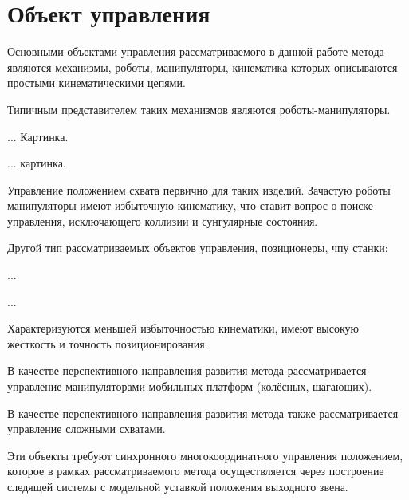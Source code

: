 \section{Объект управления}

Основными объектами управления рассматриваемого в данной работе метода являются механизмы, роботы, манипуляторы, кинематика которых описываются простыми кинематическими цепями.

Типичным представителем таких механизмов являются роботы-манипуляторы.

... Картинка.

... картинка.

Управление положением схвата первично для таких изделий. Зачастую роботы манипуляторы имеют избыточную кинематику, что ставит вопрос о поиске управления, исключающего коллизии и сунгулярные состояния.

Другой тип рассматриваемых объектов управления, позиционеры, чпу станки:

...

...

Характеризуются меньшей избыточностью кинематики, имеют высокую жесткость и точность позиционирования.

В качестве перспективного направления развития метода рассматривается управление манипуляторами мобильных платформ (колёсных, шагающих).

В качестве перспективного направления развития метода также рассматривается управление сложными схватами.

Эти объекты требуют синхронного многокоординатного управления положением, которое в рамках рассматриваемого метода осуществляется через построение следящей системы с модельной уставкой положения выходного звена.

